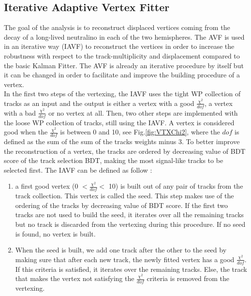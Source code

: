 \documentclass{cernatlasnote}
\begin{document}
\begin{appendices}
\subsection{Iterative Adaptive Vertex Fitter}
\label{APP: IAVF}
The goal of the analysis is to reconstruct displaced vertices coming from the decay of a long-lived neutralino in each of the two hemispheres. The AVF is used in an iterative way (IAVF) to reconstruct the vertices in order to increase the robustness with respect to the track-multiplicity and displacement compared to the basic Kalman Fitter. The AVF is already an iterative procedure by itself but it can be changed in order to facilitate and improve the building procedure of a vertex. \\
In the first two steps of the vertexing, the IAVF uses the tight WP collection of tracks as an input and the output is either a vertex with a good $\frac{\chi^2}{dof}$, a vertex with a bad $\frac{\chi^2}{dof}$ or no vertex at all. Then, two other steps are implemented with the loose WP collection of tracks, still using the IAVF. A vertex is considered good when the 
$\frac{\chi^2}{dof}$ is between 0 and 10, see Fig.\ref{fig:VTXChi2}, where the $dof$ is defined as the sum of the sum of the tracks weights minus 3. To better improve the reconstruction of a vertex, the tracks are ordered by decreasing value of BDT score of the track selection BDT, making the most signal-like tracks to be selected first. The IAVF can be defined as follow :
\begin{enumerate}
    \item a first good  vertex (0 $<\frac{\chi^2}{dof}<$ 10) is built out of any pair of tracks from the track collection. This vertex is called the seed. This step makes use of the ordering of the tracks by decreasing value of BDT score. If the first two tracks are not used to build the seed, it iterates over all the remaining tracks but no track is discarded from the vertexing during this procedure. If no seed is found, no vertex is built.
    \item When the seed is built, we add one track after the other to the seed by making sure that after each new track, the newly fitted vertex has a good $\frac{\chi^2}{dof}$. If this criteria is satisfied, it iterates over the remaining tracks. Else, the track that makes the vertex not satisfying the $\frac{\chi^2}{dof}$ criteria is removed from the vertexing.

\end{enumerate}
\end{appendices}
\end{document}
